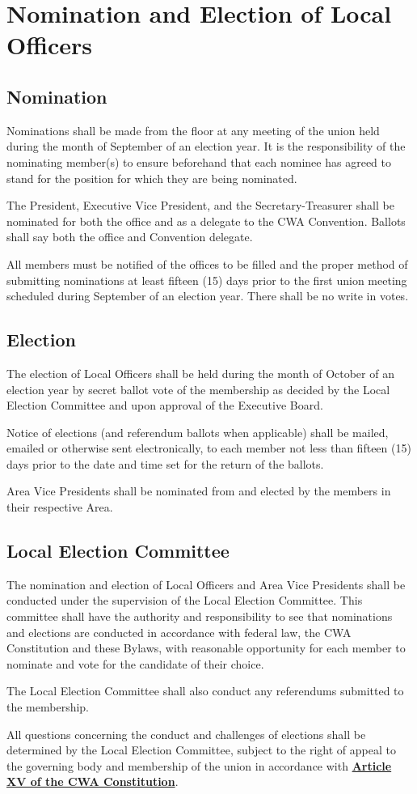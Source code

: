 \documentclass[11pt]{article}
\let\oldhref\href
\renewcommand{\href}[2]{\oldhref{#1}{\bfseries#2}}
\newcommand{\article}[1]{\vspace{.75cm}\section{#1}}
\newcommand{\articlesection}[1]{\vspace{.25cm}\subsection{#1}}
\begin{document}
\article{Nomination and Election of Local Officers}
\articlesection{Nomination}
\begin{paralist}
  \item Nominations shall be made from the floor at any meeting of the union held during the month of September of an election year. It is the responsibility of the nominating member(s) to ensure beforehand that each nominee has agreed to stand for the position for which they are being nominated.
  \item The President, Executive Vice President, and the Secretary-Treasurer shall be nominated for both the office and as a delegate to the CWA Convention. Ballots shall say both the office and Convention delegate.
  \item All members must be notified of the offices to be filled and the proper method of submitting nominations at least fifteen (15) days prior to the first union meeting scheduled during September of an election year. There shall be no write in votes.
\end{paralist}

\articlesection{Election}
\begin{paralist}
  \item The election of Local Officers shall be held during the month of October of an election year by secret ballot vote of the membership as decided by the Local Election Committee and upon approval of the Executive Board.
  \item Notice of elections (and referendum ballots when applicable) shall be mailed, emailed or otherwise sent electronically, to each member not less than fifteen (15) days prior to the date and time set for the return of the ballots.
  \item Area Vice Presidents shall be nominated from and elected by the members in their respective Area.
\end{paralist}

\articlesection{Local Election Committee}
\begin{paralist}
  \item The nomination and election of Local Officers and Area Vice Presidents shall be conducted under the supervision of the Local Election Committee. This committee shall have the authority and responsibility to see that nominations and elections are conducted in accordance with federal law, the CWA Constitution and these Bylaws, with reasonable opportunity for each member to nominate and vote for the candidate of their choice.
  \item The Local Election Committee shall also conduct any referendums submitted to the membership.
  \item All questions concerning the conduct and challenges of elections shall be determined by the Local Election Committee, subject to the right of appeal to the governing body and membership of the union in accordance with \href{https://cwa-union.org/for-locals/cwa-constitution\#A15}{Article XV of the CWA Constitution}.
\end{paralist}
\end{document}
